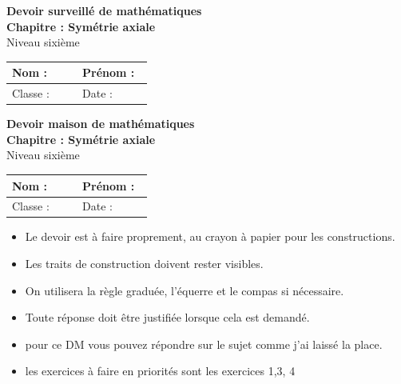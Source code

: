 \documentclass[11pt,a4paper]{article}
\begin{document}
\begin{center}
    {\Large \textbf{Devoir surveillé de mathématiques}}\\[0.2cm]
    {\large \textbf{Chapitre : Symétrie axiale}}\\[0.2cm]
    Niveau sixième
\end{center}

\vspace{0.2cm}

\begin{tabular}{|p{0.45\linewidth}|p{0.45\linewidth}|}
\hline
Nom : & Prénom : \\
\hline
Classe : & Date : \\
\hline
\end{tabular}

\vspace{0.4cm}

\begin{center}
    {\Large \textbf{Devoir maison de mathématiques}}\\[0.2cm]
    {\large \textbf{Chapitre : Symétrie axiale}}\\[0.2cm]
    Niveau sixième
\end{center}

\vspace{0.2cm}

\begin{tabular}{|p{0.45\linewidth}|p{0.45\linewidth}|}
\hline
Nom : & Prénom : \\
\hline
Classe : & Date : \\
\hline
\end{tabular}

\vspace{0.4cm}

\begin{consignes}
\begin{itemize}[label=\textbullet]
    \item Le devoir est à faire proprement, au crayon à papier pour les constructions.
    \item Les traits de construction doivent rester visibles.
    \item On utilisera la règle graduée, l'équerre et le compas si nécessaire.
    \item Toute réponse doit être justifiée lorsque cela est demandé.
    \item pour ce DM vous pouvez répondre sur le sujet comme j'ai laissé la place.
    \item les exercices à faire en priorités sont les exercices 1,3, 4
\end{itemize}
\end{consignes}
\end{document}
